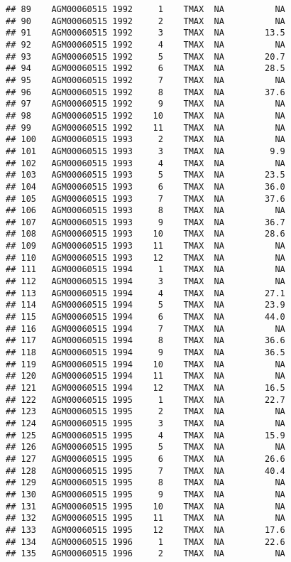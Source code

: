 \documentclass{article}\usepackage[]{graphicx}\usepackage[]{color}
\makeatletter
\newenvironment{kframe}{%
 \def\at@end@of@kframe{}%
 \ifinner\ifhmode%
  \def\at@end@of@kframe{\end{minipage}}%
  \begin{minipage}{\columnwidth}%
 \fi\fi%
 \def\FrameCommand##1{\hskip\@totalleftmargin \hskip-\fboxsep
 \colorbox{shadecolor}{##1}\hskip-\fboxsep
     \hskip-\linewidth \hskip-\@totalleftmargin \hskip\columnwidth}%
 \MakeFramed {\advance\hsize-\width
   \@totalleftmargin\z@ \linewidth\hsize
   \@setminipage}}%
 {\par\unskip\endMakeFramed%
 \at@end@of@kframe}
\newenvironment{knitrout}{}{} %
\makeatother
\begin{document}
\begin{knitrout}
\begin{kframe}
\begin{verbatim}
## 89    AGM00060515 1992     1    TMAX  NA          NA
## 90    AGM00060515 1992     2    TMAX  NA          NA
## 91    AGM00060515 1992     3    TMAX  NA        13.5
## 92    AGM00060515 1992     4    TMAX  NA          NA
## 93    AGM00060515 1992     5    TMAX  NA        20.7
## 94    AGM00060515 1992     6    TMAX  NA        28.5
## 95    AGM00060515 1992     7    TMAX  NA          NA
## 96    AGM00060515 1992     8    TMAX  NA        37.6
## 97    AGM00060515 1992     9    TMAX  NA          NA
## 98    AGM00060515 1992    10    TMAX  NA          NA
## 99    AGM00060515 1992    11    TMAX  NA          NA
## 100   AGM00060515 1993     2    TMAX  NA          NA
## 101   AGM00060515 1993     3    TMAX  NA         9.9
## 102   AGM00060515 1993     4    TMAX  NA          NA
## 103   AGM00060515 1993     5    TMAX  NA        23.5
## 104   AGM00060515 1993     6    TMAX  NA        36.0
## 105   AGM00060515 1993     7    TMAX  NA        37.6
## 106   AGM00060515 1993     8    TMAX  NA          NA
## 107   AGM00060515 1993     9    TMAX  NA        36.7
## 108   AGM00060515 1993    10    TMAX  NA        28.6
## 109   AGM00060515 1993    11    TMAX  NA          NA
## 110   AGM00060515 1993    12    TMAX  NA          NA
## 111   AGM00060515 1994     1    TMAX  NA          NA
## 112   AGM00060515 1994     3    TMAX  NA          NA
## 113   AGM00060515 1994     4    TMAX  NA        27.1
## 114   AGM00060515 1994     5    TMAX  NA        23.9
## 115   AGM00060515 1994     6    TMAX  NA        44.0
## 116   AGM00060515 1994     7    TMAX  NA          NA
## 117   AGM00060515 1994     8    TMAX  NA        36.6
## 118   AGM00060515 1994     9    TMAX  NA        36.5
## 119   AGM00060515 1994    10    TMAX  NA          NA
## 120   AGM00060515 1994    11    TMAX  NA          NA
## 121   AGM00060515 1994    12    TMAX  NA        16.5
## 122   AGM00060515 1995     1    TMAX  NA        22.7
## 123   AGM00060515 1995     2    TMAX  NA          NA
## 124   AGM00060515 1995     3    TMAX  NA          NA
## 125   AGM00060515 1995     4    TMAX  NA        15.9
## 126   AGM00060515 1995     5    TMAX  NA          NA
## 127   AGM00060515 1995     6    TMAX  NA        26.6
## 128   AGM00060515 1995     7    TMAX  NA        40.4
## 129   AGM00060515 1995     8    TMAX  NA          NA
## 130   AGM00060515 1995     9    TMAX  NA          NA
## 131   AGM00060515 1995    10    TMAX  NA          NA
## 132   AGM00060515 1995    11    TMAX  NA          NA
## 133   AGM00060515 1995    12    TMAX  NA        17.6
## 134   AGM00060515 1996     1    TMAX  NA        22.6
## 135   AGM00060515 1996     2    TMAX  NA          NA

\end{verbatim}
\end{kframe}
\end{knitrout}
\end{document}
